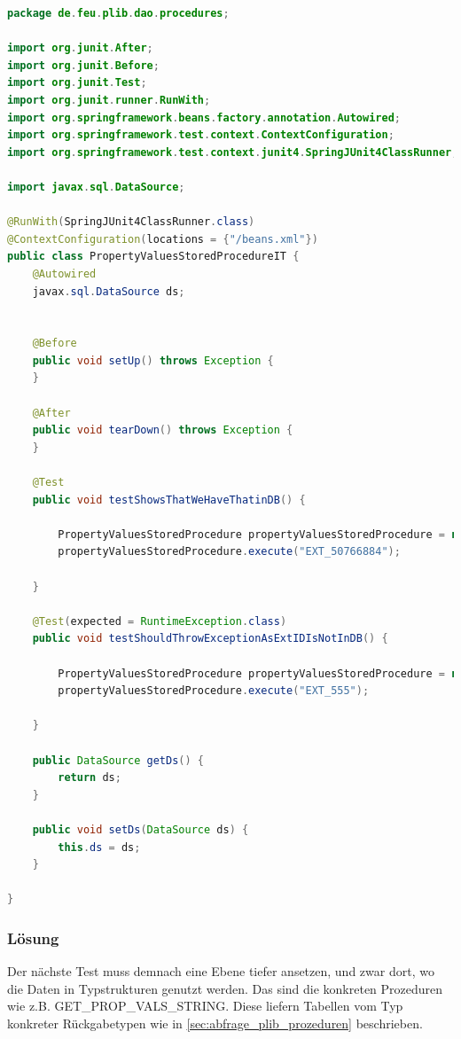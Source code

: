 \begin{lstlisting}[caption=Spring Data Oracle - Testklasse zum Aufruf der Hilfsprozeduren, language=java, label=lst:spring_data_hilf_test]
package de.feu.plib.dao.procedures;

import org.junit.After;
import org.junit.Before;
import org.junit.Test;
import org.junit.runner.RunWith;
import org.springframework.beans.factory.annotation.Autowired;
import org.springframework.test.context.ContextConfiguration;
import org.springframework.test.context.junit4.SpringJUnit4ClassRunner;

import javax.sql.DataSource;

@RunWith(SpringJUnit4ClassRunner.class)
@ContextConfiguration(locations = {"/beans.xml"})
public class PropertyValuesStoredProcedureIT {
    @Autowired
    javax.sql.DataSource ds;


    @Before
    public void setUp() throws Exception {
    }

    @After
    public void tearDown() throws Exception {
    }

    @Test
    public void testShowsThatWeHaveThatinDB() {

        PropertyValuesStoredProcedure propertyValuesStoredProcedure = new PropertyValuesStoredProcedure(ds);
        propertyValuesStoredProcedure.execute("EXT_50766884");

    }

    @Test(expected = RuntimeException.class)
    public void testShouldThrowExceptionAsExtIDIsNotInDB() {

        PropertyValuesStoredProcedure propertyValuesStoredProcedure = new PropertyValuesStoredProcedure(ds);
        propertyValuesStoredProcedure.execute("EXT_555");

    }

    public DataSource getDs() {
        return ds;
    }

    public void setDs(DataSource ds) {
        this.ds = ds;
    }

}

\end{lstlisting}

\subsubsection{Lösung}

Der nächste Test muss demnach eine Ebene tiefer ansetzen, und zwar dort, wo die Daten in Typstrukturen genutzt werden. Das sind die konkreten Prozeduren wie z.B. GET\_PROP\_VALS\_STRING. Diese liefern Tabellen vom Typ konkreter Rückgabetypen wie in \autoref{sec:abfrage_plib_prozeduren} beschrieben. 

